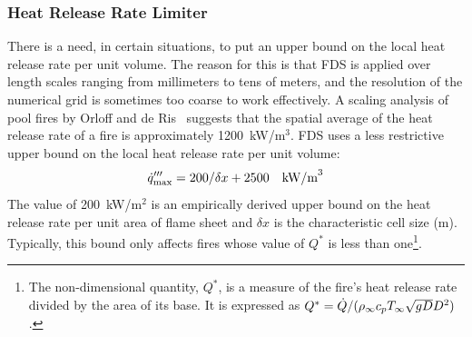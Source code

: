 \subsubsection{Heat Release Rate Limiter}

There is a need, in certain situations, to put an upper bound on the local heat release rate per unit volume. The reason for
this is that FDS is applied over length scales ranging from millimeters to tens of meters, and the resolution of the numerical grid
is sometimes too coarse to work effectively.
A scaling analysis of pool fires by Orloff and de Ris~\cite{Orloff:19th_Symposium} suggests that the spatial average of the
heat release rate of a fire is approximately 1200~kW/m$^3$. FDS uses a less restrictive upper bound on the local heat release rate per unit volume:
\begin{equation}\label{eq:q_bound}
\dot{q}_{\max}''' = 200/\delta x + 2500 \quad \hbox{kW/m}^3
\end{equation}
The value of 200~kW/m$^2$ is an empirically derived upper bound on the heat release rate per unit area of flame sheet and $\delta x$ is the characteristic cell size (m). Typically, this bound only affects fires whose value of $Q^*$ is less than one\footnote{The non-dimensional quantity, $Q^*$, is a measure of the fire's heat release rate divided by the area of its base. It is expressed as $Q^*=\dot{Q}/(\rho_\infty c_p T_\infty \sqrt{g D} D^2)$.}.

